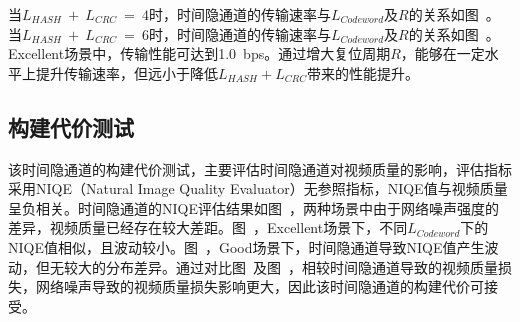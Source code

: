 当$L_{HASH}\ +\ L_{CRC}\ =\ 4$时，时间隐通道的传输速率与$L_{Codeword}$及$R$的关系如图\ 。当$L_{HASH}\ +\ L_{CRC}\ =\ 6$时，时间隐通道的传输速率与$L_{Codeword}$及$R$的关系如图\ 。Excellent场景中，传输性能可达到{1.0\ bps}。通过增大复位周期$R$，能够在一定水平上提升传输速率，但远小于降低$L_{HASH}+L_{CRC}$带来的性能提升。

\subsection{构建代价测试}
\label{chap:hash:result:cost}


该时间隐通道的构建代价测试，主要评估时间隐通道对视频质量的影响，评估指标采用NIQE（Natural Image Quality Evaluator）无参照指标，NIQE值与视频质量呈负相关。时间隐通道的NIQE评估结果如图\ ，两种场景中由于网络噪声强度的差异，视频质量已经存在较大差距。图\ ，Excellent场景下，不同$L_{Codeword}$下的NIQE值相似，且波动较小。图\ ，Good场景下，时间隐通道导致NIQE值产生波动，但无较大的分布差异。通过对比图\ 及图\ ，相较时间隐通道导致的视频质量损失，网络噪声导致的视频质量损失影响更大，因此该时间隐通道的构建代价可接受。

